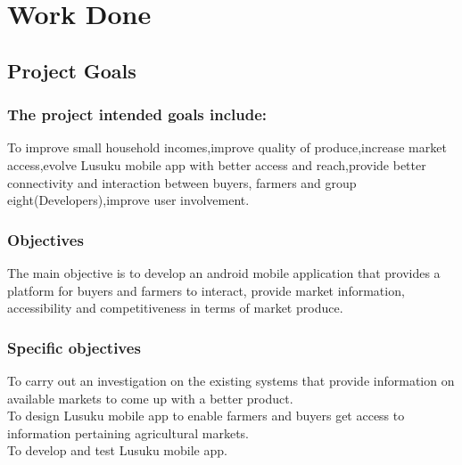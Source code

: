 \chapter{Work Done}

\section{Project Goals}

\subsection{The project intended goals include:}
To improve small household incomes,improve quality of produce,increase market access,evolve Lusuku mobile app with better access and reach,provide better connectivity and interaction between buyers, farmers and group eight(Developers),improve user involvement.

\subsection{Objectives}
The main objective is to develop an android mobile application that provides a platform for buyers and farmers to interact, provide market information, accessibility and competitiveness in terms of market produce.
\subsection{Specific objectives}
To carry out an investigation on the existing systems that provide information on available markets to come up with a better product.\\
To design Lusuku mobile app to enable farmers and buyers get access to information pertaining agricultural markets.\\
To develop and test Lusuku mobile app.


